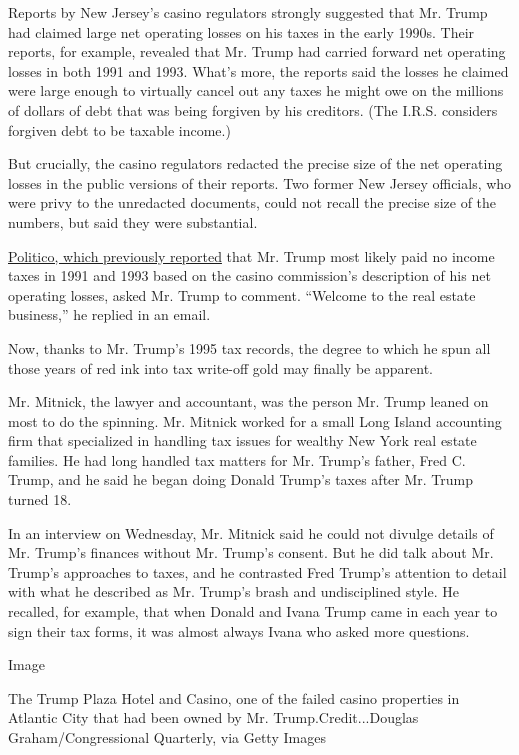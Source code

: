 Reports by New Jersey's casino regulators strongly suggested that Mr.
Trump had claimed large net operating losses on his taxes in the early
1990s. Their reports, for example, revealed that Mr. Trump had carried
forward net operating losses in both 1991 and 1993. What's more, the
reports said the losses he claimed were large enough to virtually cancel
out any taxes he might owe on the millions of dollars of debt that was
being forgiven by his creditors. (The I.R.S. considers forgiven debt to
be taxable income.)

But crucially, the casino regulators redacted the precise size of the
net operating losses in the public versions of their reports. Two former
New Jersey officials, who were privy to the unredacted documents, could
not recall the precise size of the numbers, but said they were
substantial.

\href{http://www.politico.com/story/2016/06/donald-trump-no-taxes-224498}{Politico,
which previously reported} that Mr. Trump most likely paid no income
taxes in 1991 and 1993 based on the casino commission's description of
his net operating losses, asked Mr. Trump to comment. ``Welcome to the
real estate business,'' he replied in an email.

Now, thanks to Mr. Trump's 1995 tax records, the degree to which he spun
all those years of red ink into tax write-off gold may finally be
apparent.

Mr. Mitnick, the lawyer and accountant, was the person Mr. Trump leaned
on most to do the spinning. Mr. Mitnick worked for a small Long Island
accounting firm that specialized in handling tax issues for wealthy New
York real estate families. He had long handled tax matters for Mr.
Trump's father, Fred C. Trump, and he said he began doing Donald Trump's
taxes after Mr. Trump turned 18.

In an interview on Wednesday, Mr. Mitnick said he could not divulge
details of Mr. Trump's finances without Mr. Trump's consent. But he did
talk about Mr. Trump's approaches to taxes, and he contrasted Fred
Trump's attention to detail with what he described as Mr. Trump's brash
and undisciplined style. He recalled, for example, that when Donald and
Ivana Trump came in each year to sign their tax forms, it was almost
always Ivana who asked more questions.

Image

The Trump Plaza Hotel and Casino, one of the failed casino properties in
Atlantic City that had been owned by Mr. Trump.Credit...Douglas
Graham/Congressional Quarterly, via Getty Images

